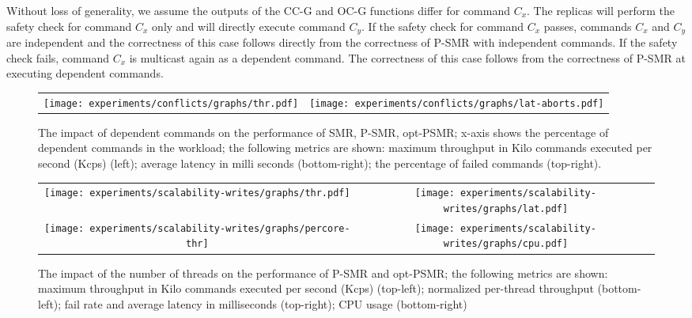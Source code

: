 \documentclass[conference]{IEEEtran}
\newcommand{\sizefactor}{0.9}
\begin{document}
Without loss of generality, we assume the outputs of the CC-G and OC-G functions differ for command $C_x$. 
The replicas will perform the safety check for command $C_x$ only and will directly execute command $C_y$. 
If the safety check for command $C_x$ passes, commands $C_x$ and $C_y$ are independent and the correctness of this case follows directly from the correctness of P-SMR with independent commands. 
If the safety check fails, command $C_x$ is multicast again as a dependent command. 
The correctness of this case follows from the correctness of P-SMR at executing dependent commands. 
















\begin{figure*}[t]
  \begin{center}
    \begin{tabular}{cc}
      \texttt{[image: experiments/conflicts/graphs/thr.pdf]}&
       \texttt{[image: experiments/conflicts/graphs/lat-aborts.pdf]}\\
    \end{tabular}
    \caption{The impact of dependent commands on the performance of SMR, P-SMR, opt-PSMR; x-axis  shows the percentage of dependent commands in the workload; the following metrics are shown: maximum throughput in Kilo commands executed per second (Kcps) (left);  average latency in milli seconds (bottom-right); the percentage of failed commands (top-right).}
    \label{fig:mixed-workloads}
 \end{center}
\end{figure*}

\begin{figure*}[ht]
  \begin{center}
    \begin{tabular}{cc}
      \texttt{[image: experiments/scalability-writes/graphs/thr.pdf]}&
       \texttt{[image: experiments/scalability-writes/graphs/lat.pdf]}\\
      \texttt{[image: experiments/scalability-writes/graphs/percore-thr]}&
       \texttt{[image: experiments/scalability-writes/graphs/cpu.pdf]}\\
       
    \end{tabular}
    \caption{The impact of the number of threads on the performance of P-SMR and opt-PSMR; the following metrics are shown: maximum throughput in Kilo commands executed per second (Kcps) (top-left); normalized per-thread throughput (bottom-left); fail rate and average latency in milliseconds (top-right); CPU usage (bottom-right)}
    \label{fig:scalability:writes}
 \end{center}
\end{figure*}
\end{document}
